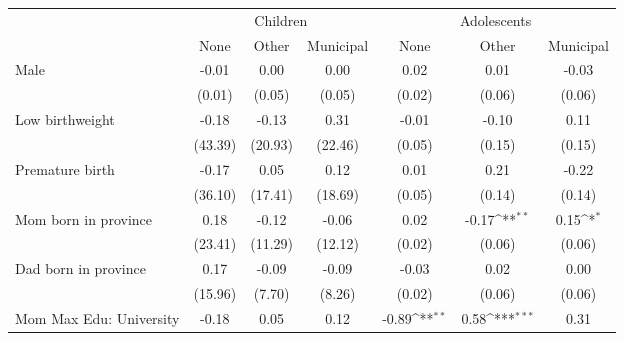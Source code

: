 {
\def\sym#1{\ifmmode^{#1}\else\(^{#1}\)\fi}
\begin{tabular}{l*{6}{c}}
\toprule
			& \multicolumn{3}{c}{Children} & \multicolumn{3}{c}{Adolescents} \\
                    &\multicolumn{1}{c}{None}&\multicolumn{1}{c}{Other}&\multicolumn{1}{c}{Municipal}&\multicolumn{1}{c}{None}&\multicolumn{1}{c}{Other}&\multicolumn{1}{c}{Municipal}\\
\midrule
Male                &       -0.01         &        0.00         &        0.00         &        0.02         &        0.01         &       -0.03         \\
                    &      (0.01)         &      (0.05)         &      (0.05)         &      (0.02)         &      (0.06)         &      (0.06)         \\
\addlinespace
Low birthweight     &       -0.18         &       -0.13         &        0.31         &       -0.01         &       -0.10         &        0.11         \\
                    &     (43.39)         &     (20.93)         &     (22.46)         &      (0.05)         &      (0.15)         &      (0.15)         \\
\addlinespace
Premature birth     &       -0.17         &        0.05         &        0.12         &        0.01         &        0.21         &       -0.22         \\
                    &     (36.10)         &     (17.41)         &     (18.69)         &      (0.05)         &      (0.14)         &      (0.14)         \\
\addlinespace
Mom born in province&        0.18         &       -0.12         &       -0.06         &        0.02         &       -0.17\sym{**} &        0.15\sym{*}  \\
                    &     (23.41)         &     (11.29)         &     (12.12)         &      (0.02)         &      (0.06)         &      (0.06)         \\
\addlinespace
Dad born in province&        0.17         &       -0.09         &       -0.09         &       -0.03         &        0.02         &        0.00         \\
                    &     (15.96)         &      (7.70)         &      (8.26)         &      (0.02)         &      (0.06)         &      (0.06)         \\
\addlinespace
Mom Max Edu: University&       -0.18         &        0.05         &        0.12         &       -0.89\sym{**} &        0.58\sym{***}&        0.31         \\

\end{tabular}}
